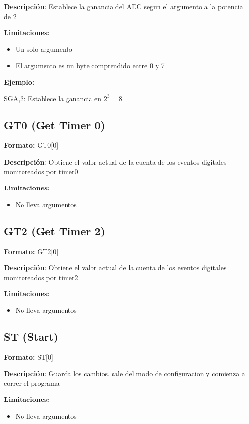 \textbf{Descripci\'on:}
Establece la ganancia del ADC segun el argumento a la potencia de 2

\textbf{Limitaciones:}
\begin{itemize}
  \item Un solo argumento
  \item El argumento es un byte comprendido entre 0 y 7
\end{itemize}

\textbf{Ejemplo:}

SGA,3: Establece la ganancia en $2^{3} = 8$


\subsection{GT0 (Get Timer 0)} %
\label{sub:gt0_get_timer_0}


\textbf{Formato:} GT0[0]

\textbf{Descripci\'on:}
Obtiene el valor actual de la cuenta de los eventos digitales monitoreados por timer0

\textbf{Limitaciones:}
\begin{itemize}
  \item No lleva argumentos
\end{itemize}

\subsection{GT2 (Get Timer 2)} %
\label{sub:gt2_get_timer_2}

\textbf{Formato:} GT2[0]

\textbf{Descripci\'on:}
Obtiene el valor actual de la cuenta de los eventos digitales monitoreados por timer2

\textbf{Limitaciones:}
\begin{itemize}
  \item No lleva argumentos
\end{itemize}

\subsection{ST (Start)} %
\label{sub:st_start}


\textbf{Formato:} ST[0]

\textbf{Descripci\'on:}
Guarda los cambios, sale del modo de configuracion y comienza a correr el programa

\textbf{Limitaciones:}
\begin{itemize}
  \item No lleva argumentos
\end{itemize}



